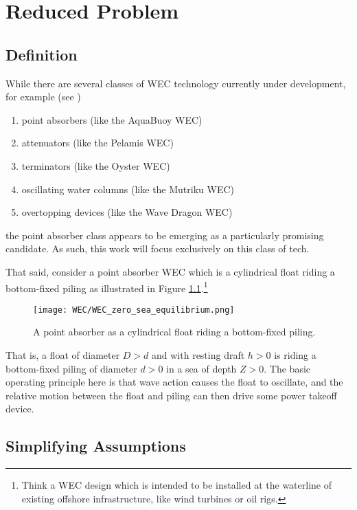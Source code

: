 \chapter{Reduced Problem}

\section{Definition}

While there are several classes of WEC technology currently under development, for example (see \cite{Zhang_2021})

\begin{enumerate}
	\item point absorbers (like the AquaBuoy WEC)
	\item attenuators (like the Pelamis WEC)
	\item terminators (like the Oyster WEC)
	\item oscillating water columns (like the Mutriku WEC)
	\item overtopping devices (like the Wave Dragon WEC)
\end{enumerate}

\noindent the point absorber class appears to be emerging as a particularly promising candidate. As such, this work will focus exclusively on this class of tech. \par 
That said, consider a point absorber WEC which is a cylindrical float riding a bottom-fixed piling as illustrated in Figure \ref{fig:WEC_reduced_problem}.\footnote{Think a WEC design which is intended to be installed at the waterline of existing offshore infrastructure, like wind turbines or oil rigs.}

\begin{figure}[H]
    \centering
    \texttt{[image: WEC/WEC\_zero\_sea\_equilibrium.png]}
    \caption{A point absorber as a cylindrical float riding a bottom-fixed piling.}
    \label{fig:WEC_reduced_problem}
\end{figure}

\noindent That is, a float of diameter $D>d$ and with resting draft $h>0$ is riding a bottom-fixed piling of diameter $d>0$ in a sea of depth $Z>0$. The basic operating principle here is that wave action causes the float to oscillate, and the relative motion between the float and piling can then drive some power takeoff device.

\section{Simplifying Assumptions}

